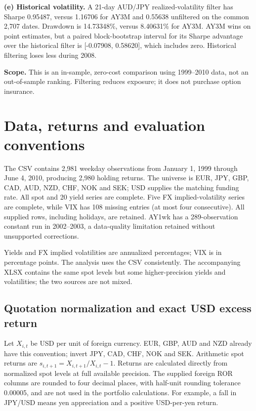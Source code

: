 \documentclass[10pt,letterpaper]{article}
\newcommand{\rCondDD}{8.40631}
\newcommand{\rHistSharpe}{0.95487}
\newcommand{\rHistDD}{14.73348}
\newcommand{\rEBaseSharpe}{0.55638}
\newcommand{\rEImpliedSharpe}{1.16706}
\newcommand{\rCIDiffLow}{-0.07908}
\newcommand{\rCIDiffHigh}{0.58620}
\begin{document}
\textbf{(e) Historical volatility.} A 21-day AUD/JPY realized-volatility filter has Sharpe
\rHistSharpe{}, versus \rEImpliedSharpe{} for AY3M and \rEBaseSharpe{} unfiltered on the common
2,707 dates. Drawdown is \rHistDD{}\%, versus \rCondDD{}\% for AY3M. AY3M wins on point estimates,
but a paired block-bootstrap interval for its Sharpe advantage over the historical filter is
[\rCIDiffLow{}, \rCIDiffHigh{}], which includes zero. Historical filtering loses less during 2008.

\textbf{Scope.} This is an in-sample, zero-cost comparison using 1999--2010 data, not an
out-of-sample ranking. Filtering reduces exposure; it does not purchase option insurance.
\newpage
\section{Data, returns and evaluation conventions}
The CSV contains 2,981 weekday observations from January 1, 1999 through June 4, 2010,
producing 2,980 holding returns. The universe is EUR, JPY, GBP, CAD, AUD, NZD, CHF, NOK and SEK;
USD supplies the matching funding rate. All spot and 20 yield series are complete. Five FX
implied-volatility series are complete, while VIX has 108 missing entries (at most four consecutive).
All supplied rows, including holidays, are retained. AY1wk has a 289-observation constant run
in 2002--2003, a data-quality limitation retained without unsupported corrections.

Yields and FX implied volatilities are annualized percentages; VIX is in percentage points.
The analysis uses the CSV consistently. The accompanying XLSX contains the same spot levels
but some higher-precision yields and volatilities; the two sources are not mixed.

\subsection{Quotation normalization and exact USD excess return}
Let $X_{i,t}$ be USD per unit of foreign currency. EUR, GBP, AUD and NZD already have this
convention; invert JPY, CAD, CHF, NOK and SEK. Arithmetic spot returns are
$s_{i,t+1}=X_{i,t+1}/X_{i,t}-1$. Returns are calculated directly from normalized spot levels at full available precision.
The supplied foreign ROR columns are rounded to four decimal places, with half-unit rounding
tolerance 0.00005, and are not used in the portfolio calculations.
For example, a fall in JPY/USD means yen appreciation and a positive USD-per-yen return.
\end{document}
